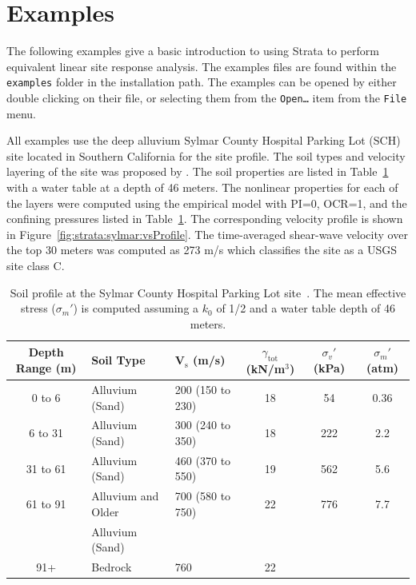 \documentclass[12pt,oneside]{book}
\begin{document}
\section{Examples}
The following examples give a basic introduction to using Strata to perform equivalent linear site
response analysis.  The examples files are found within the \texttt{examples} folder in the
installation path.  The examples can be opened by either double clicking on their file, or selecting
them from the \texttt{Open\dots} item from the \texttt{File} menu.

All examples use the deep alluvium Sylmar County Hospital Parking Lot (SCH) site located in Southern
California for the site profile.  The soil types and velocity layering of the site was proposed by
\citet{chang:96}.  The soil properties are listed in Table~\ref{tab:strata:sylmar:soil} with a water
table at a depth of 46 meters. The nonlinear properties for each of the layers were computed using
the \citet{darendeli:01} empirical model with PI=0, OCR=1, and the confining pressures listed in
Table~\ref{tab:strata:sylmar:soil}.  The corresponding velocity profile is shown in
Figure~\ref{fig:strata:sylmar:vsProfile}. The time-averaged shear-wave velocity over the top 30
meters was computed as 273 m/s which classifies the site as a USGS site class C.

\begin{table}
    \centering
    \begin{tabular}{cllccc}
        \hline\hline
        \textbf{Depth Range} (m) & \textbf{Soil Type} & \textbf{V$_\text{s}$} (m/s) &
        \textbf{$\gamma_\text{tot}$} (kN/m$^3$) & \textbf{$\sigma_v'$} (kPa) & \textbf{$\sigma_{m}'$} (atm) \\
        \hline
        0 to 6 & Alluvium (Sand) & 200 (150 to 230) & 18 & 54 & 0.36\\
        6 to 31 & Alluvium (Sand) & 300 (240 to 350) & 18 & 222 & 2.2 \\
        31 to 61 & Alluvium (Sand) & 460 (370 to 550) & 19 & 562 & 5.6 \\
        61 to 91 & Alluvium and Older & 700 (580 to 750) & 22 & 776 & 7.7 \\
                 & Alluvium (Sand) \\
        91+ & Bedrock & 760 & 22 \\
        \hline\hline
    \end{tabular}
    \caption{Soil profile at the Sylmar County Hospital Parking Lot site~\citep{chang:96}. The mean
        effective stress ($\sigma_{m}'$) is computed assuming a $k_0$ of 1/2 and a water table depth of 46
    meters.}
    \label{tab:strata:sylmar:soil}
\end{table}
\end{document}
